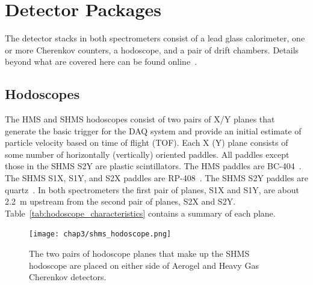 \section{Detector Packages}
The detector stacks in both spectrometers consist of a lead glass calorimeter,
one or more Cherenkov counters, a hodoscope, and a pair of drift chambers.
Details beyond what are covered here can be found
online~\cite{Standard_Equipment_Manual}.

\subsection{Hodoscopes}

The HMS and SHMS hodoscopes consist of two pairs of X/Y planes
that generate the basic trigger for the DAQ system and provide an initial
estimate of particle velocity based on time of flight (TOF).
Each X (Y) plane consists of some number of horizontally (vertically) oriented
paddles.
All paddles except those in the SHMS S2Y are plastic scintillators.
The HMS paddles are BC-404~\cite{Standard_Equipment_Manual,BC404}.
The SHMS S1X, S1Y, and S2X paddles are RP-408~\cite{SHMS_hodo_plastic,RP408}.
The SHMS S2Y paddles are quartz~\cite{SHMS_hodo_quartz}.
In both spectrometers the first pair of planes, S1X and S1Y, are
about \SI{2.2}{m} upstream from the second pair of planes, S2X and S2Y.
Table~\ref{tab:hodoscope_characteristics} contains a summary of each plane.

\begin{figure}[!h]
    \centering
    \texttt{[image: chap3/shms\_hodoscope.png]}
    \caption{The two pairs of hodoscope planes that make up the SHMS
             hodoscope are placed on either side of Aerogel and Heavy Gas
             Cherenkov detectors.}
    \label{fig:shms_hodoscope}
\end{figure}

